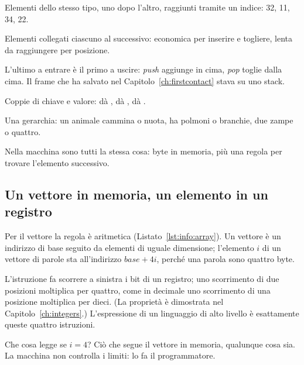 \begin{description}[style=nextline,leftmargin=1.5em]
\item[Vettore (array).] Elementi dello stesso tipo, uno dopo l'altro, raggiunti
  tramite un indice: 32, 11, 34, 22.
\item[Lista.] Elementi collegati ciascuno al successivo: economica per inserire
  e togliere, lenta da raggiungere per posizione.
\item[Pila (stack).] L'ultimo a entrare è il primo a uscire: \emph{push}
  aggiunge in cima, \emph{pop} toglie dalla cima. Il frame che ha salvato
   nel Capitolo~\ref{ch:firstcontact} stava su uno stack.
\item[Dizionario.] Coppie di chiave e valore:  dà ,
   dà ,  dà .
\item[Albero.] Una gerarchia: un animale cammina o nuota, ha polmoni o
  branchie, due zampe o quattro.
\end{description}

Nella macchina sono tutti la stessa cosa: byte in memoria, più una regola per
trovare l'elemento successivo.

\subsection{Un vettore in memoria, un elemento in un registro}

Per il vettore la regola è aritmetica (Listato~\ref{lst:info:array}). Un
vettore è un indirizzo di base seguito da elementi di uguale dimensione;
l'elemento $i$ di un vettore di parole sta all'indirizzo $\mathit{base}+4i$,
perché una parola sono quattro byte.


L'istruzione  fa scorrere a sinistra i bit di un registro; uno
scorrimento di due posizioni moltiplica per quattro, come in decimale uno
scorrimento di una posizione moltiplica per dieci. (La proprietà è dimostrata
nel Capitolo~\ref{ch:integers}.) L'espressione  di un
linguaggio di alto livello è esattamente queste quattro istruzioni.

\begin{prgwarn}
Che cosa legge  se $i=4$? Ciò che segue il vettore in memoria,
qualunque cosa sia. La macchina non controlla i limiti: lo fa il programmatore.
\end{prgwarn}

